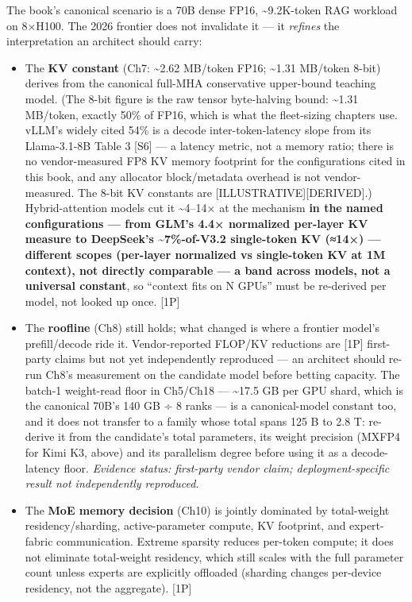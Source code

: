 The book's canonical scenario is a 70B dense FP16,
\textasciitilde9.2K-token RAG workload on 8×H100. The 2026 frontier does
not invalidate it --- it \emph{refines} the interpretation an architect
should carry:

\begin{itemize}
\tightlist
\item
  The \textbf{KV constant} (Ch7: \textasciitilde2.62 MB/token FP16;
  \textasciitilde1.31 MB/token 8-bit) derives from the canonical
  full-MHA conservative upper-bound teaching model. (The 8-bit figure is
  the raw tensor byte-halving bound: \textasciitilde1.31 MB/token,
  exactly 50\% of FP16, which is what the fleet-sizing chapters use.
  vLLM's widely cited 54\% is a decode inter-token-latency slope from
  its Llama-3.1-8B Table 3 \mbox{{[}S6{]}} --- a latency metric, not a memory
  ratio; there is no vendor-measured FP8 KV memory footprint for the
  configurations cited in this book, and any allocator block/metadata
  overhead is not vendor-measured. The 8-bit KV constants are
  \mbox{{[}ILLUSTRATIVE{]}}\hspace{0pt}\mbox{{[}DERIVED{]}}.) Hybrid-attention models cut it
  \textasciitilde4--14× at the mechanism \textbf{in the named
  configurations --- from GLM's 4.4× normalized per-layer KV measure to
  DeepSeek's \textasciitilde7\%-of-V3.2 single-token KV (≈14×) ---
  different scopes (per-layer normalized vs single-token KV at 1M
  context), not directly comparable --- a band across models, not a
  universal constant}, so ``context fits on N GPUs'' must be re-derived
  per model, not looked up once. \mbox{{[}1P{]}}
\item
  The \textbf{roofline} (Ch8) still holds; what changed is where a
  frontier model's prefill/decode ride it. Vendor-reported FLOP/KV
  reductions are \mbox{{[}1P{]}} first-party claims but not yet independently
  reproduced --- an architect should re-run Ch8's measurement on the
  candidate model before betting capacity. The batch-1 weight-read floor
  in Ch5/Ch18 --- \textasciitilde17.5 GB per GPU shard, which is the
  canonical 70B's 140 GB ÷ 8 ranks --- is a canonical-model constant
  too, and it does not transfer to a family whose total spans 125 B to
  2.8 T: re-derive it from the candidate's total parameters, its weight
  precision (MXFP4 for Kimi K3, above) and its parallelism degree before
  using it as a decode-latency floor. \emph{Evidence status: first-party
  vendor claim; deployment-specific result not independently
  reproduced.}
\item
  The \textbf{MoE memory decision} (Ch10) is jointly dominated by
  total-weight residency/sharding, active-parameter compute, KV
  footprint, and expert-fabric communication. Extreme sparsity reduces
  per-token compute; it does not eliminate total-weight residency, which
  still scales with the full parameter count unless experts are
  explicitly offloaded (sharding changes per-device residency, not the
  aggregate). \mbox{{[}1P{]}}
\end{itemize}

